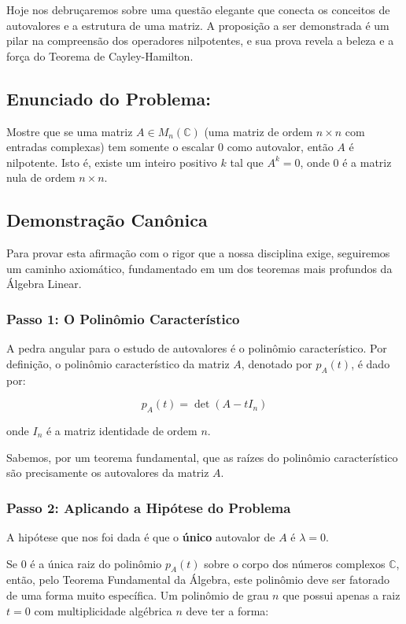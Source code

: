 Hoje nos debruçaremos sobre uma questão elegante que conecta os conceitos de autovalores e a
estrutura de uma matriz. A proposição a ser demonstrada é um pilar na compreensão dos
operadores nilpotentes, e sua prova revela a beleza e a força do Teorema de Cayley-Hamilton.

\subsection*{Enunciado do Problema:}

Mostre que se uma matriz $A \in M_n(\mathbb{C})$ (uma matriz de ordem $n \times n$ com entradas complexas) tem
somente o escalar $0$ como autovalor, então $A$ é nilpotente. Isto é, existe um inteiro positivo $k$ tal que
$A^k = 0$, onde $0$ é a matriz nula de ordem $n \times n$.

\subsection*{Demonstração Canônica}

Para provar esta afirmação com o rigor que a nossa disciplina exige, seguiremos um caminho
axiomático, fundamentado em um dos teoremas mais profundos da Álgebra Linear.

\subsubsection*{Passo 1: O Polinômio Característico}

A pedra angular para o estudo de autovalores é o polinômio característico. Por definição, o polinômio
característico da matriz $A$, denotado por $p_A(t)$, é dado por:

\[
p_A(t) = \det(A - tI_n)
\]

onde $I_n$ é a matriz identidade de ordem $n$.

Sabemos, por um teorema fundamental, que as raízes do polinômio característico são precisamente
os autovalores da matriz $A$.

\subsubsection*{Passo 2: Aplicando a Hipótese do Problema}

A hipótese que nos foi dada é que o \textbf{único} autovalor de $A$ é $\lambda = 0$.

Se $0$ é a única raiz do polinômio $p_A(t)$ sobre o corpo dos números complexos $\mathbb{C}$, então, pelo
Teorema Fundamental da Álgebra, este polinômio deve ser fatorado de uma forma muito específica.
Um polinômio de grau $n$ que possui apenas a raiz $t=0$ com multiplicidade algébrica $n$ deve ter a
forma:


